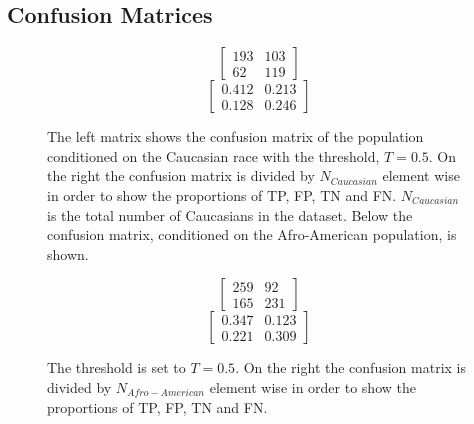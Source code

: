 \documentclass[11pt, fleqn, titlepage]{article}
\begin{document}
	\subsection{Confusion Matrices}\label{confusionMatrices}
	
	\begin{figure}[h]	
	\begin{multicols}{2}
		\begin{ceqn}
		\begin{equation*}
		\begin{bmatrix}
		193 & 103  \\
		62 & 119 
		\end{bmatrix} 
		\end{equation*} 
		\begin{equation*}
		\begin{bmatrix}
		0.412 & 0.213  \\
		0.128 & 0.246 
		\end{bmatrix} 
		\end{equation*}
		\end{ceqn}
	\end{multicols}
	{The left matrix shows the confusion matrix of the population conditioned on the Caucasian race with the threshold, $ T = 0.5 $. On the right the confusion matrix is divided by $ N_{Caucasian} $ element wise in order to show the proportions of TP, FP, TN and FN. $ N_{Caucasian} $ is the total number of Caucasians in the dataset. Below the confusion matrix, conditioned on the Afro-American population, is shown.}
	\end{figure}
	\begin{figure}[h]	
		\begin{multicols}{2}
			\begin{ceqn}
			\begin{equation*}
			\begin{bmatrix}
			259 & 92  \\
			165 & 231 
			\end{bmatrix} 
			\end{equation*} 
			\begin{equation*}
			\begin{bmatrix}
			0.347 & 0.123 \\
			0.221 & 0.309 
			\end{bmatrix} 
			\end{equation*}
			\end{ceqn}
		\end{multicols}
		{The threshold is set to $ T = 0.5 $. On the right the confusion matrix is divided by $ N_{Afro-American} $ element wise in order to show the proportions of TP, FP, TN and FN.}
	\end{figure}
	
\end{document}
